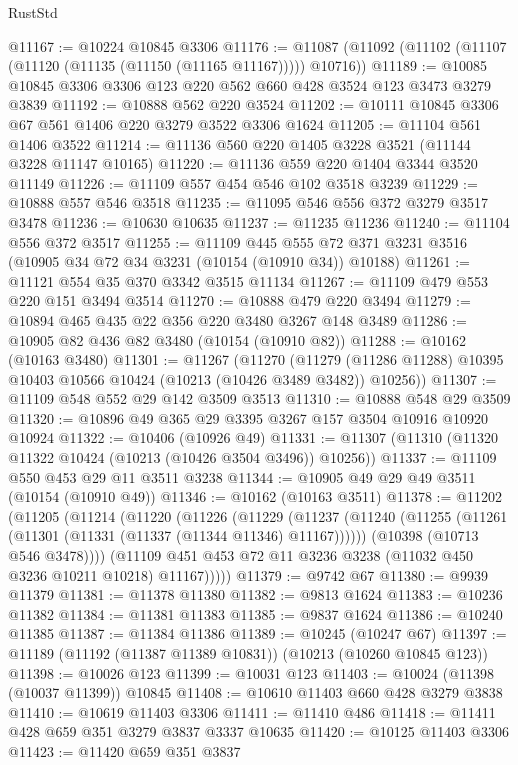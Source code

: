 \begin{lexlean}{RustStd}
\begin{coremodule}
@11167 := @10224 @10845 @3306
@11176 := @11087 (@11092 (@11102 (@11107 (@11120 (@11135 (@11150 (@11165 @11167))))) @10716))
@11189 := @10085 @10845 @3306 @3306 @123 @220 @562 @660 @428 @3524 @123 @3473 @3279 @3839
@11192 := @10888 @562 @220 @3524
@11202 := @10111 @10845 @3306 @67 @561 @1406 @220 @3279 @3522 @3306 @1624
@11205 := @11104 @561 @1406 @3522
@11214 := @11136 @560 @220 @1405 @3228 @3521 (@11144 @3228 @11147 @10165)
@11220 := @11136 @559 @220 @1404 @3344 @3520 @11149
@11226 := @11109 @557 @454 @546 @102 @3518 @3239
@11229 := @10888 @557 @546 @3518
@11235 := @11095 @546 @556 @372 @3279 @3517 @3478
@11236 := @10630 @10635
@11237 := @11235 @11236
@11240 := @11104 @556 @372 @3517
@11255 := @11109
    @445
    @555
    @72
    @371
    @3231
    @3516
    (@10905 @34 @72 @34 @3231 (@10154 (@10910 @34)) @10188)
@11261 := @11121 @554 @35 @370 @3342 @3515 @11134
@11267 := @11109 @479 @553 @220 @151 @3494 @3514
@11270 := @10888 @479 @220 @3494
@11279 := @10894 @465 @435 @22 @356 @220 @3480 @3267 @148 @3489
@11286 := @10905 @82 @436 @82 @3480 (@10154 (@10910 @82))
@11288 := @10162 (@10163 @3480)
@11301 := @11267
    (@11270
      (@11279 (@11286 @11288) @10395 @10403 @10566 @10424 (@10213 (@10426 @3489 @3482)) @10256))
@11307 := @11109 @548 @552 @29 @142 @3509 @3513
@11310 := @10888 @548 @29 @3509
@11320 := @10896 @49 @365 @29 @3395 @3267 @157 @3504 @10916 @10920 @10924
@11322 := @10406 (@10926 @49)
@11331 := @11307 (@11310 (@11320 @11322 @10424 (@10213 (@10426 @3504 @3496)) @10256))
@11337 := @11109 @550 @453 @29 @11 @3511 @3238
@11344 := @10905 @49 @29 @49 @3511 (@10154 (@10910 @49))
@11346 := @10162 (@10163 @3511)
@11378 := @11202
    (@11205
      (@11214
        (@11220
          (@11226
            (@11229
              (@11237
                (@11240 (@11255 (@11261 (@11301 (@11331 (@11337 (@11344 @11346) @11167))))))
                (@10398 (@10713 @546 @3478))))
            (@11109 @451 @453 @72 @11 @3236 @3238 (@11032 @450 @3236 @10211 @10218) @11167)))))
@11379 := @9742 @67
@11380 := @9939 @11379
@11381 := @11378 @11380
@11382 := @9813 @1624
@11383 := @10236 @11382
@11384 := @11381 @11383
@11385 := @9837 @1624
@11386 := @10240 @11385
@11387 := @11384 @11386
@11389 := @10245 (@10247 @67)
@11397 := @11189 (@11192 (@11387 @11389 @10831)) (@10213 (@10260 @10845 @123))
@11398 := @10026 @123
@11399 := @10031 @123
@11403 := @10024 (@11398 (@10037 @11399)) @10845
@11408 := @10610 @11403 @660 @428 @3279 @3838
@11410 := @10619 @11403 @3306
@11411 := @11410 @486
@11418 := @11411 @428 @659 @351 @3279 @3837 @3337 @10635
@11420 := @10125 @11403 @3306
@11423 := @11420 @659 @351 @3837

\end{coremodule}
\end{lexlean}
